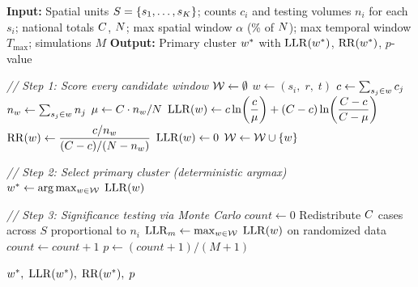 
\begin{algorithm}[H]
\caption{Kulldorff Prospective Space-Time Scan Statistic~\cite{kulldorff1997,neill2004}}
\label{alg:kulldorff}
\begin{algorithmic}[1]

\Statex \textbf{Input:}
  Spatial units $S = \{s_1, \ldots, s_K\}$;
  counts $c_i$ and testing volumes $n_i$ for each $s_i$;
  national totals $C$, $N$;
  max spatial window $\alpha$ (\% of $N$);
  max temporal window $T_{\max}$;
  simulations $M$
\Statex \textbf{Output:}
  Primary cluster $w^*$ with $\mathrm{LLR}(w^*)$, $\mathrm{RR}(w^*)$, $p$-value

\Statex
\Statex \textit{// Step 1: Score every candidate window}
\State $\mathcal{W} \gets \emptyset$
            \State $w \gets (s_i,\; r,\; t)$
            \State $c \gets \sum_{s_j \in w} c_j$
            \State $n_w \gets \sum_{s_j \in w} n_j$
            \State $\mu \gets C \cdot n_w / N$
            \If{$\cobs > \muexp$}
                \State $\mathrm{LLR}(w) \gets
                    c \ln\!\left(\dfrac{c}{\mu}\right)
                    + (C - c)\ln\!\left(\dfrac{C - c}{C - \mu}\right)$
                \State $\mathrm{RR}(w) \gets
                    \dfrac{c / n_w}{(C - c) / (N - n_w)}$
            \Else
                \State $\mathrm{LLR}(w) \gets 0$
            \EndIf
            \State $\mathcal{W} \gets \mathcal{W} \cup \{w\}$
        \EndFor
    \EndFor
\EndFor

\Statex
\Statex \textit{// Step 2: Select primary cluster (deterministic argmax)}
\State $w^* \gets \arg\max_{w \in \mathcal{W}}\; \mathrm{LLR}(w)$

\Statex
\Statex \textit{// Step 3: Significance testing via Monte Carlo}
\State $\textit{count} \gets 0$
    \State Redistribute $C$ cases across $S$ proportional to $n_i$
    \State $\mathrm{LLR}_m \gets \max_{w \in \mathcal{W}}\; \mathrm{LLR}(w)$ on randomized data
        \State $\textit{count} \gets \textit{count} + 1$
    \EndIf
\EndFor
\State $p \gets (\textit{count} + 1) / (M + 1)$

\State \Return $w^*,\; \mathrm{LLR}(w^*),\; \mathrm{RR}(w^*),\; p$

\end{algorithmic}
\end{algorithm}
